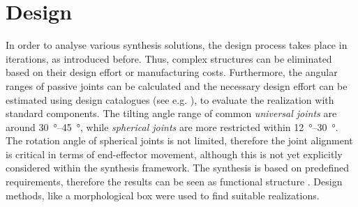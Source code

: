 \documentclass[runningheads]{llncs}
\begin{document}
\section{Design}\label{sec:design}
%
%
In order to analyse various synthesis solutions, the design process takes place in iterations, as introduced before. 
Thus, complex structures can be eliminated based on their design effort or manufacturing costs.
Furthermore, the angular ranges of passive joints can be calculated and the necessary design effort can be estimated using design catalogues (see e.g. \cite{StechertFraVie2010}), to evaluate the realization with standard components.
The tilting angle range of common \emph{universal joints} are around \SI{30}{\degree}--\SI{45}{\degree}, while \emph{spherical joints} are more restricted within \SI{12}{\degree}--\SI{30}{\degree}. %
The rotation angle of spherical joints is not limited, therefore the joint alignment is critical in terms of end-effector movement, although this is not yet explicitly considered within the synthesis framework.
The synthesis is based on predefined requirements, therefore the results can be seen as functional structure \cite{Neugebauer.2006}. 
Design methods, like a morphological box were used to find suitable realizations.
\end{document}
